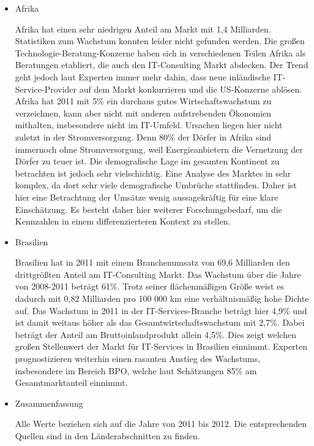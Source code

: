 \begin{itemize}
\item {Afrika}

Afrika hat einen sehr niedrigen Anteil am Markt mit 1,4 Milliarden. \cite{statAfr} Statistiken zum Wachstum konnten leider nicht gefunden werden. Die großen Technologie-Beratung-Konzerne haben sich in verschiedenen Teilen Afrika als Beratungen etabliert, die auch den IT-Consulting Markt abdecken. Der Trend geht jedoch laut Experten immer mehr dahin, dass neue inländische IT-Service-Provider auf dem Markt konkurrieren und die US-Konzerne ablösen. Afrika hat 2011 mit 5\% ein durchaus gutes Wirtschaftswachstum zu verzeichnen, kann aber nicht mit anderen aufstrebenden Ökonomien mithalten, insbesondere nicht im IT-Umfeld. \cite{statAfr2}
Ursachen liegen hier nicht zuletzt in der Stromversorgung. Denn 80\% der Dörfer in Afrika sind immernoch ohne Stromversorgung, weil Energieanbietern die Vernetzung der Dörfer zu teuer ist.  \cite{dieZeit}
Die demografische Lage im gesamten Kontinent zu betrachten ist jedoch sehr vielschichtig. Eine Analyse des Marktes in sehr komplex, da dort sehr viele demografische Umbrüche stattfinden. Daher ist hier eine Betrachtung der Umsätze wenig aussagekräftig für eine klare Einschätzung. Es besteht daher hier weiterer Forschungsbedarf, um die Kennzahlen in einem differenzierteren  Kontext zu stellen.


\item {Brasilien}

Brasilien hat in 2011 mit einem Branchenumsatz von 69,6 Milliarden den drittgrößten Anteil am IT-Consulting Markt. Das Wachstum über die Jahre von 2008-2011 beträgt 61\%. \cite{statBras2} Trotz seiner flächenmäßigen Größe weist es dadurch mit 0,82 Milliarden pro 100 000 km eine verhältnismäßig hohe Dichte auf. Das Wachstum in 2011 in der IT-Services-Branche beträgt hier 4,9\% und ist damit weitaus höher als das Gesamtwirtschaftswachstum mit 2,7\%. Dabei beträgt der Anteil am Bruttoinlandprodukt allein 4,5\%. Dies zeigt welchen großen Stellenwert der Markt für IT-Services in Brasilien einnimmt. Experten prognostizieren weiterhin einen rasanten Anstieg des Wachstums, insbesondere im Bereich BPO, welche laut Schätzungen 85\% am Gesamtmarktanteil einnimmt.\cite{statBras}

\item {Zusammenfassung}

Alle Werte beziehen sich auf die Jahre von 2011 bis 2012. Die entsprechenden Quellen sind in den Länderabschnitten zu finden.




\end{itemize}

